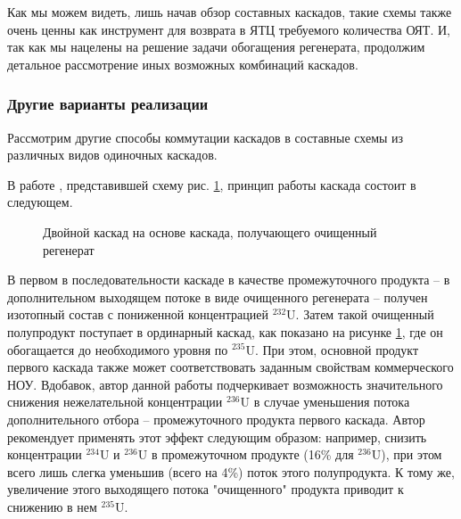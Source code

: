 Как мы можем видеть, лишь начав обзор составных каскадов, такие схемы также очень ценны как инструмент для возврата в ЯТЦ требуемого количества ОЯТ.
И, так как мы нацелены на решение задачи обогащения регенерата, продолжим детальное рассмотрение иных возможных комбинаций каскадов.

\subsubsection{Другие варианты реализации}
Рассмотрим другие способы коммутации каскадов в составные схемы из различных видов одиночных каскадов.

В работе \cite{palkinPurificationReprocessedUranium2016}, представившей схему рис. \ref{fig:int_double}, принцип работы каскада состоит в следующем.

\begin{figure}[ht]
  \caption{Двойной каскад на основе каскада, получающего очищенный регенерат}\label{fig:int_double}
\end{figure}

В первом в последовательности каскаде в качестве промежуточного продукта -- в дополнительном выходящем потоке в виде очищенного регенерата -- получен изотопный состав с пониженной концентрацией $^{232}$U.
Затем такой очищенный полупродукт поступает в ординарный каскад, как показано на рисунке \ref{fig:int_double}, где он обогащается до необходимого уровня по $^{235}$U.
При этом, основной продукт первого каскада также может соответствовать заданным свойствам коммерческого НОУ.
Вдобавок, автор данной работы подчеркивает возможность значительного снижения нежелательной концентрации $^{236}$U в случае уменьшения потока дополнительного отбора -- промежуточного продукта первого каскада.
Автор рекомендует применять этот эффект следующим образом: например, снизить концентрации  $^{234}$U и  $^{236}$U в промежуточном продукте (16\% для  $^{236}$U), при этом всего лишь слегка уменьшив (всего на 4\%) поток этого полупродукта.
К тому же, увеличение этого выходящего потока "очищенного" продукта приводит к снижению в нем $^{235}$U.

